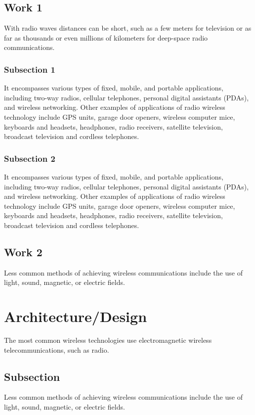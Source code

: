 \documentclass[conference]{IEEEtran}
\begin{document}
\subsection{Work 1}
With radio waves distances can be short, such as a few meters
for television or as far as thousands or even millions of
kilometers for deep-space radio communications.

\subsubsection{Subsection 1}
It encompasses various types of fixed, mobile, and
portable applications, including two-way radios, cellular
telephones, personal digital assistants (PDAs), and
wireless networking. Other examples of applications 
of radio wireless technology include GPS units, garage 
door openers, wireless computer mice, keyboards and headsets,
 headphones, radio receivers, satellite television,
broadcast television and cordless telephones.

\subsubsection{Subsection 2}
It encompasses various types of fixed, mobile, and
portable applications, including two-way radios, cellular
telephones, personal digital assistants (PDAs), \cite{2} and
wireless networking. Other examples of applications 
of radio wireless technology include GPS units, garage 
door openers, wireless computer mice, keyboards and headsets,
 headphones, radio receivers, satellite television,
broadcast television and cordless telephones.

\subsection{Work 2}
Less common methods of achieving wireless communications
include the use of light, sound, magnetic, or electric fields.

\section{Architecture/Design}
The most common wireless technologies use electromagnetic
wireless telecommunications, such as radio.

\subsection{Subsection}
Less common methods of achieving wireless communications
include the use of light, sound, magnetic, or electric fields.
\end{document}
